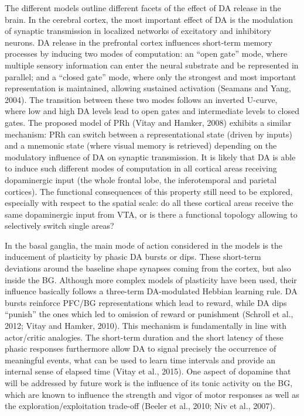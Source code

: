 \documentclass[
  11pt,
  a4paper,
]{scrbook}
\begin{document}
The different models outline different facets of the effect of DA
release in the brain. In the cerebral cortex, the most important effect
of DA is the modulation of synaptic transmission in localized networks
of excitatory and inhibitory neurons. DA release in the prefrontal
cortex influences short-term memory processes by inducing two modes of
computation: an ``open gate'' mode, where multiple sensory information
can enter the neural substrate and be represented in parallel; and a
``closed gate'' mode, where only the strongest and most important
representation is maintained, allowing sustained activation (Seamans and
Yang, 2004). The transition between these two modes follows an inverted
U-curve, where low and high DA levels lead to open gates and
intermediate levels to closed gates. The proposed model of PRh (Vitay
and Hamker, 2008) exhibits a similar mechanism: PRh can switch between a
representational state (driven by inputs) and a mnemonic state (where
visual memory is retrieved) depending on the modulatory influence of DA
on synaptic transmission. It is likely that DA is able to induce such
different modes of computation in all cortical areas receiving
dopaminergic input (the whole frontal lobe, the inferotemporal and
parietal cortices). The functional consequences of this property still
need to be explored, especially with respect to the spatial scale: do
all these cortical areas receive the same dopaminergic input from VTA,
or is there a functional topology allowing to selectively switch single
areas?

In the basal ganglia, the main mode of action considered in the models
is the inducement of plasticity by phasic DA bursts or dips. These
short-term deviations around the baseline shape synapses coming from the
cortex, but also inside the BG. Although more complex models of
plasticity have been used, their influence basically follows a
three-term DA-modulated Hebbian learning rule. DA bursts reinforce
PFC/BG representations which lead to reward, while DA dips ``punish''
the ones which led to omission of reward or punishment (Schroll et al.,
2012; Vitay and Hamker, 2010). This mechanism is fundamentally in line
with actor/critic analogies. The short-term duration and the short
latency of these phasic responses furthermore allow DA to signal
precisely the occurrence of meaningful events, what can be used to learn
time intervals and provide an internal sense of elapsed time (Vitay et
al., 2015). One aspect of dopamine that will be addressed by future work
is the influence of its tonic activity on the BG, which are known to
influence the strength and vigor of motor responses as well as the
exploration/exploitation trade-off (Beeler et al., 2010; Niv et al.,
2007).
\end{document}
